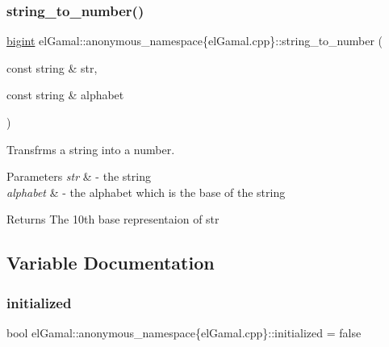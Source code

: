 \subsubsection{\texorpdfstring{string\+\_\+to\+\_\+number()}{string\_to\_number()}}
{\footnotesize\ttfamily \mbox{\hyperlink{namespaceelGamal_ab2883bf41ce8d738e2428c8ae81b0245}{bigint}} el\+Gamal\+::anonymous\+\_\+namespace\{el\+Gamal.\+cpp\}\+::string\+\_\+to\+\_\+number (\begin{DoxyParamCaption}\item[{const string \&}]{str,  }\item[{const string \&}]{alphabet }\end{DoxyParamCaption})}



Transfrms a string into a number. 


\begin{DoxyParams}{Parameters}
{\em str} & -\/ the string \\
\hline
{\em alphabet} & -\/ the alphabet which is the base of the string\\
\hline
\end{DoxyParams}
\begin{DoxyReturn}{Returns}
The 10th base representaion of str 
\end{DoxyReturn}


\subsection{Variable Documentation}
\mbox{\label{namespaceelGamal_1_1anonymous__namespace_02elGamal_8cpp_03_a84c2d63e328c14f55fe67906cfd6a9ad}} 
\subsubsection{\texorpdfstring{initialized}{initialized}}
{\footnotesize\ttfamily bool el\+Gamal\+::anonymous\+\_\+namespace\{el\+Gamal.\+cpp\}\+::initialized = false\hspace{0.3cm}{\ttfamily [static]}}



